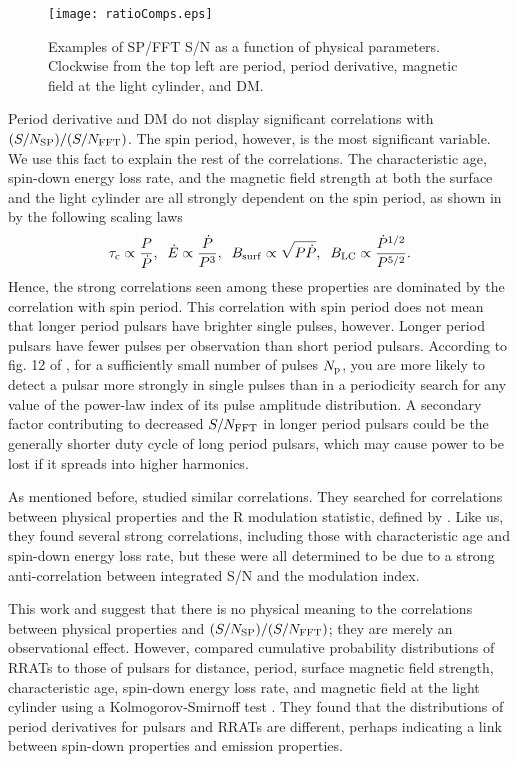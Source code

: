 \documentclass[fleqn,usenatbib]{mnras}
\begin{document}
\begin{figure*}
\centering
\texttt{[image: ratioComps.eps]}
\caption[SP/FFT S/N vs physical parameters]{Examples of SP/FFT S/N as a function of physical parameters. Clockwise from the top left are period, period derivative, magnetic field at the light cylinder, and DM.}
\label{fig:ratio_vs_params}
\end{figure*}

Period derivative and DM do not display significant correlations with 
$(S/N_{\rm SP})/(S/N_{\rm FFT})$. The spin period, however, is the most significant variable. We 
use this fact to explain the rest of the correlations. The characteristic age, spin-down energy 
loss rate, and the magnetic field strength at both the surface and the light cylinder are all 
strongly dependent on the spin period, as shown in \citet{Lorimer:2004} by the following scaling 
laws
\begin{equation}
\tau_{\rm c}\propto\frac{P}{\dot{P}},\;\;\dot{E}\propto\frac{\dot{P}}{P^3},\;\;B_{\rm surf}\propto\sqrt{P\dot{P}},\;\;B_{\rm LC}\propto\frac{\dot{P}^{1/2}}{P^{5/2}}.
\end{equation}
Hence, the strong correlations seen among these properties are dominated by the correlation with spin period. This correlation with spin period does not mean that longer period pulsars have brighter single pulses, however. Longer period pulsars have fewer pulses per observation than short period pulsars. According to fig. 12 of \citet{McLaughlin:2003}, for a sufficiently small number of pulses $N_{\rm p}$, you are more likely to detect a pulsar more strongly in single pulses than in a periodicity search for any value of the power-law index of its pulse amplitude distribution. A secondary factor contributing to decreased $S/N_{\rm FFT}$ in longer period pulsars could be the generally shorter duty cycle of long period pulsars, which may cause power to be lost if it spreads into higher harmonics.

As mentioned before, \citet{Burke-Spolaor:2012} studied similar correlations. They 
searched for correlations between physical properties and the R modulation statistic, defined by 
\citet{Johnston:2001}. Like us, they found several strong correlations, including those with 
characteristic age and spin-down energy loss rate, but these were all determined to be due 
to a strong anti-correlation between integrated S/N and the modulation index.

This work and \citet{Burke-Spolaor:2012} suggest that there is no physical meaning to the correlations between physical properties and $(S/N_{\rm SP})/(S/N_{\rm FFT})$; they are merely an observational effect. However, \citet{Cui:2017} compared cumulative probability distributions of RRATs to those of 
pulsars for distance, period, surface magnetic field strength, characteristic age, spin-down 
energy loss rate, and magnetic field at the light cylinder using a Kolmogorov-Smirnoff test 
\citep{Press:1986}. They found that the distributions of period derivatives for pulsars and 
RRATs are different, perhaps indicating a link between spin-down properties and emission properties.
\end{document}

